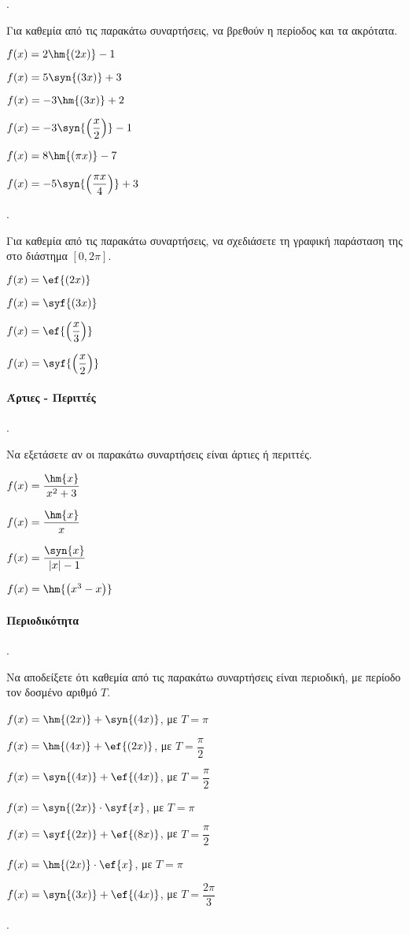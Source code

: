 \documentclass[11pt,a4paper,twocolumn]{article}
\newcounter{askhsh}
\newcommand{\askhsh}{\large\theaskhsh.\ \addtocounter{askhsh}{1}}
\begin{document}
\askhsh Για καθεμία από τις παρακάτω συναρτήσεις, να βρεθούν η περίοδος και τα ακρότατα.
\begin{alist}
\item $f(x)=2\hm{(2x)}-1$
\item $f(x)=5\syn{(3x)}+3$
\item $f(x)=-3\hm{(3x)}+2$
\item $f(x)=-3\syn{\left(\dfrac{x}{2}\right)}-1$
\item $f(x)=8\hm{(\pi x)}-7$
\item $f(x)=-5\syn{\left(\dfrac{\pi x}{4}\right)}+3$
\end{alist}
\askhsh Για καθεμία από τις παρακάτω συναρτήσεις, να σχεδιάσετε τη γραφική παράσταση της στο διάστημα $[0,2\pi]$.
\begin{multicols}{2}
\begin{alist}
\item $f(x)=\ef{(2x)}$
\item $f(x)=\syf{(3x)}$
\item $f(x)=\ef{\left(\dfrac{x}{3}\right)}$
\item $f(x)=\syf{\left(\dfrac{x}{2}\right)}$
\end{alist}
\end{multicols}
\paragraph{Άρτιες - Περιττές}
\askhsh Να εξετάσετε αν οι παρακάτω συναρτήσεις είναι άρτιες ή περιττές.
\begin{multicols}{2}
\begin{alist}
\item $f(x)=\dfrac{\hm{x}}{x^2+3}$
\item $f(x)=\dfrac{\hm{x}}{x}$
\item $f(x)=\dfrac{\syn{x}}{|x|-1}$
\item $f(x)=\hm{\left(x^3-x\right)}$
\end{alist}
\end{multicols}
\paragraph{Περιοδικότητα}
\askhsh Να αποδείξετε ότι καθεμία από τις παρακάτω συναρτήσεις είναι περιοδική, με περίοδο τον δοσμένο αριθμό $T$.
\begin{alist}
\item $f(x)=\hm{(2x)}+\syn{(4x)}$, με $T=\pi$
\item $f(x)=\hm{(4x)}+\ef{(2x)}$, με $T=\dfrac{\pi}{2}$
\item $f(x)=\syn{(4x)}+\ef{(4x)}$, με $T=\dfrac{\pi}{2}$
\item $f(x)=\syn{(2x)}\cdot\syf{x}$, με $T=\pi$
\item $f(x)=\syf{(2x)}+\ef{(8x)}$, με $T=\dfrac{\pi}{2}$
\item $f(x)=\hm{(2x)}\cdot\ef{x}$, με $T=\pi$
\item $f(x)=\syn{(3x)}+\ef{(4x)}$, με $T=\dfrac{2\pi}{3}$
\end{alist}
\askhsh
\end{document}

